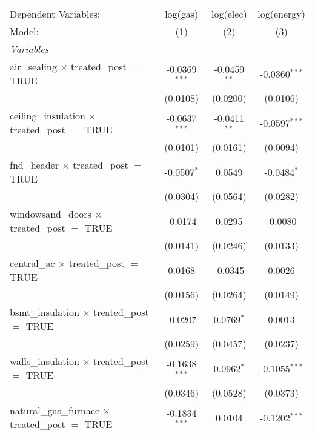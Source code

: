 
\begin{tabular}{lccc}
   \tabularnewline\midrule\midrule
   Dependent Variables:                                      & log(gas)        & log(elec)      & log(energy)\\
   Model:                                                    & (1)             & (2)            & (3)\\
   \midrule \emph{Variables} &   &   &  \\
   air\_sealing $\times$ treated\_post $=$ TRUE           & -0.0369$^{***}$ & -0.0459$^{**}$ & -0.0360$^{***}$\\
                                                             & (0.0108)        & (0.0200)       & (0.0106)\\
   ceiling\_insulation $\times$ treated\_post $=$ TRUE    & -0.0637$^{***}$ & -0.0411$^{**}$ & -0.0597$^{***}$\\
                                                             & (0.0101)        & (0.0161)       & (0.0094)\\
   fnd\_header $\times$ treated\_post $=$ TRUE            & -0.0507$^{*}$   & 0.0549         & -0.0484$^{*}$\\
                                                             & (0.0304)        & (0.0564)       & (0.0282)\\
   windowsand\_doors $\times$ treated\_post $=$ TRUE      & -0.0174         & 0.0295         & -0.0080\\
                                                             & (0.0141)        & (0.0246)       & (0.0133)\\
   central\_ac $\times$ treated\_post $=$ TRUE            & 0.0168          & -0.0345        & 0.0026\\
                                                             & (0.0156)        & (0.0264)       & (0.0149)\\
   bsmt\_insulation $\times$ treated\_post $=$ TRUE       & -0.0207         & 0.0769$^{*}$   & 0.0013\\
                                                             & (0.0259)        & (0.0457)       & (0.0237)\\
   walls\_insulation $\times$ treated\_post $=$ TRUE      & -0.1638$^{***}$ & 0.0962$^{*}$   & -0.1055$^{***}$\\
                                                             & (0.0346)        & (0.0528)       & (0.0373)\\
   natural\_gas\_furnace $\times$ treated\_post $=$ TRUE & -0.1834$^{***}$ & 0.0104         & -0.1202$^{***}$\\

\end{tabular}

